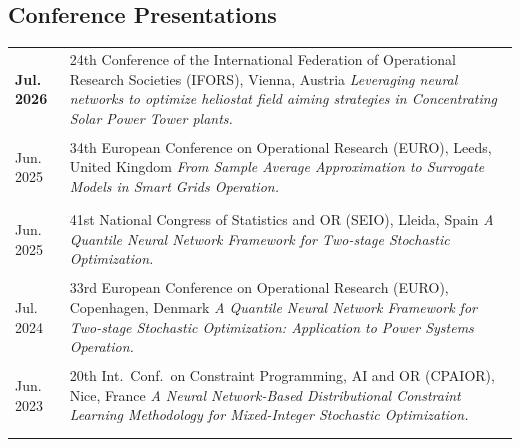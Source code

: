 \documentclass[10pt,a4paper]{article}
\makeatletter
\newenvironment{cvtable}
  {\begin{longtable}{@{} >{\raggedright\arraybackslash\bfseries}p{0.135\textwidth}
                        !{\color{rulegray}\vrule width 0.9pt}
                        >{\raggedright\arraybackslash}p{0.83\textwidth} @{}}}
  {\end{longtable}}
\newcommand{\cvitem}[2]{%
  #1 & #2 \tabularnewline \noalign{\vskip 4pt}%
}
\makeatother
\begin{document}
\subsection*{Conference Presentations}
\begin{cvtable}
    \cvitem{Jul. 2026}{24th Conference of the International Federation of Operational
    Research Societies (IFORS), Vienna, Austria\newline
    \textit{Leveraging neural networks to optimize heliostat field aiming strategies in Concentrating Solar Power Tower plants.}}
    \cvitem{Jun. 2025}{34th European Conference on Operational Research (EURO), Leeds, United Kingdom\newline
    \textit{From Sample Average Approximation to Surrogate Models in Smart Grids Operation.}}
    \cvitem{Jun. 2025}{41st National Congress of Statistics and OR (SEIO), Lleida, Spain\newline
    \textit{A Quantile Neural Network Framework for Two-stage Stochastic Optimization.}}
    \cvitem{Jul. 2024}{33rd European Conference on Operational Research (EURO), Copenhagen, Denmark\newline
    \textit{A Quantile Neural Network Framework for Two-stage Stochastic Optimization: Application to Power Systems Operation.}}
    \cvitem{Jun. 2023}{20th Int.\ Conf.\ on Constraint Programming, AI and OR (CPAIOR), Nice, France\newline
    \textit{A Neural Network-Based Distributional Constraint Learning Methodology for Mixed-Integer Stochastic Optimization.}}
\end{cvtable}

\end{document}
